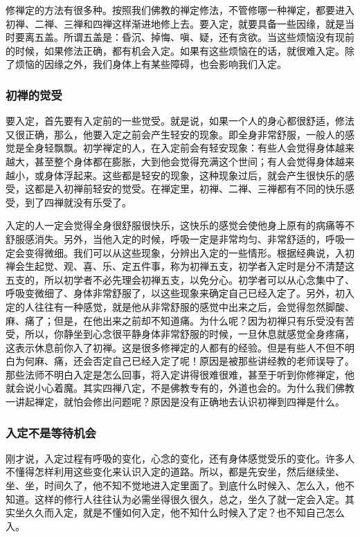 \documentclass{book}
\begin{document}
修禅定的方法有很多种。按照我们佛教的禅定修法，不管修哪一种禅定，都要进入初禅、二禅、三禅和四禅这样渐进地修上去。要入定，就要具备一些因缘，就是当时要离五盖。所谓五盖是：昏沉、掉悔、嗔、疑，还有贪欲。当这些烦恼没有现前的时候，如果修法正确，都有机会入定。如果有这些烦恼在的话，就很难入定。除了烦恼的因缘之外，我们身体上有某些障碍，也会影响我们入定。

\subsubsection{初禅的觉受}

要入定，首先要有入定前的一些觉受。就是说，如果一个人的身心都很舒适，修法又很正确，那么，他要入定之前会产生轻安的现象。即全身非常舒服，一般人的感觉是全身轻飘飘。初学禅定的人，在入定前会有轻安现象：有些人会觉得身体越来越大，甚至整个身体都在膨胀，大到他会觉得充满这个世间；有人会觉得身体越来越小，或身体浮起来。这些都是轻安的现象，这种现象过后，就会产生很快乐的感受，这都是入初禅前轻安的觉受。在禅定里，初禅、二禅、三禅都有不同的快乐感受，到了四禅就没有乐受了。

入定的人一定会觉得全身很舒服很快乐，这快乐的感觉会使他身上原有的病痛等不舒服感消失。另外，当他入定的时候，呼吸一定是非常均匀、非常舒适的，呼吸一定会变得微细。我们可以从这些现象，分辨出入定的一些情形。根据经典说，入初禅会生起觉、观、喜、乐、定五件事，称为初禅五支，初学者入定时是分不清楚这五支的，所以初学者不必先理会初禅五支，以免分心。初学者可以从心念集中了、呼吸变微细了、身体非常舒服了，以这些现象来确定自己已经入定了。另外，初入定的人往往有一种感觉，就是他从非常舒服的感觉中出来之后，会觉得忽然脚酸、麻、痛了；但是，在他出来之前却不知道痛。为什么呢？因为初禅只有乐受没有苦受，所以，你静坐到心念很平静身体非常舒服的时候，一旦休息就感觉全身疼痛，这表示休息前你入了初禅。这是很多修禅定的人都有的经验。但是有些人不但不明白为何麻、痛，还会否定自己已经入定了呢！原因是被那些讲经教的老师误导了。那些法师不明白入定是怎么回事，将入定讲得很难很难，甚至于听到你修禅定，他就会说小心着魔。其实四禅八定，不是佛教专有的，外道也会的。为什么我们佛教一讲起禅定，就怕会修出问题呢？原因是没有正确地去认识初禅到四禅是什么。

\subsubsection{入定不是等待机会}

刚才说，入定过程有呼吸的变化，心念的变化，还有身体感觉受乐的变化。许多人不懂得怎样利用这些变化来认识入定的道路。所以，都是先安坐，然后继续坐、坐、坐，时间久了，他不知不觉地进入定里面了。到底什么时候入、怎么入，他不知道。这样的修行人往往认为必需坐得很久很久，总之，坐久了就一定会入定。其实坐久久而入定，就是不懂如何入定，他不知什么时候入了定？也不知自己怎么入。
\end{document}
